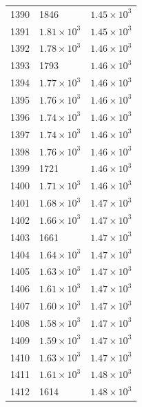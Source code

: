 \begin{table}[H]
\begin{tabular}{lll}
1390 & 1846 & $\displaystyle 1.45 \times 10^{3}$ \\
1391 & $\displaystyle 1.81 \times 10^{3}$ & $\displaystyle 1.45 \times 10^{3}$ \\
1392 & $\displaystyle 1.78 \times 10^{3}$ & $\displaystyle 1.46 \times 10^{3}$ \\
1393 & 1793 & $\displaystyle 1.46 \times 10^{3}$ \\
1394 & $\displaystyle 1.77 \times 10^{3}$ & $\displaystyle 1.46 \times 10^{3}$ \\
1395 & $\displaystyle 1.76 \times 10^{3}$ & $\displaystyle 1.46 \times 10^{3}$ \\
1396 & $\displaystyle 1.74 \times 10^{3}$ & $\displaystyle 1.46 \times 10^{3}$ \\
1397 & $\displaystyle 1.74 \times 10^{3}$ & $\displaystyle 1.46 \times 10^{3}$ \\
1398 & $\displaystyle 1.76 \times 10^{3}$ & $\displaystyle 1.46 \times 10^{3}$ \\
1399 & 1721 & $\displaystyle 1.46 \times 10^{3}$ \\
1400 & $\displaystyle 1.71 \times 10^{3}$ & $\displaystyle 1.46 \times 10^{3}$ \\
1401 & $\displaystyle 1.68 \times 10^{3}$ & $\displaystyle 1.47 \times 10^{3}$ \\
1402 & $\displaystyle 1.66 \times 10^{3}$ & $\displaystyle 1.47 \times 10^{3}$ \\
1403 & 1661 & $\displaystyle 1.47 \times 10^{3}$ \\
1404 & $\displaystyle 1.64 \times 10^{3}$ & $\displaystyle 1.47 \times 10^{3}$ \\
1405 & $\displaystyle 1.63 \times 10^{3}$ & $\displaystyle 1.47 \times 10^{3}$ \\
1406 & $\displaystyle 1.61 \times 10^{3}$ & $\displaystyle 1.47 \times 10^{3}$ \\
1407 & $\displaystyle 1.60 \times 10^{3}$ & $\displaystyle 1.47 \times 10^{3}$ \\
1408 & $\displaystyle 1.58 \times 10^{3}$ & $\displaystyle 1.47 \times 10^{3}$ \\
1409 & $\displaystyle 1.59 \times 10^{3}$ & $\displaystyle 1.47 \times 10^{3}$ \\
1410 & $\displaystyle 1.63 \times 10^{3}$ & $\displaystyle 1.47 \times 10^{3}$ \\
1411 & $\displaystyle 1.61 \times 10^{3}$ & $\displaystyle 1.48 \times 10^{3}$ \\
1412 & 1614 & $\displaystyle 1.48 \times 10^{3}$ \\

\end{tabular}
\end{table}
